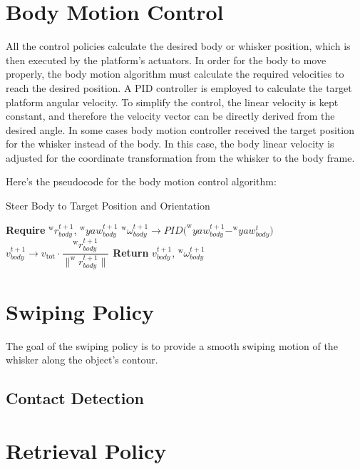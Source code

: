 \section{Body Motion Control}
All the control policies calculate the desired body or whisker position, which is then executed by the platform's actuators.
In order for the body to move properly, the body motion algorithm must calculate the required velocities to reach the desired position.
A PID controller is employed to calculate the target platform angular velocity.
To simplify the control, the linear velocity is kept constant, and therefore the velocity vector can be directly derived from the desired angle.
In some cases body motion controller received the target position for the whisker instead of the body.
In this case, the body linear velocity is adjusted for the coordinate transformation from the whisker to the body frame.

Here's the pseudocode for the body motion control algorithm:

\begin{algorithm}[htb]
    \caption{Steer Body to Target Position and Orientation}
    \begin{algorithmic}
        \State \textbf{Require} \(^{\mathrm{w}}r_{body}^{t+1}\), \(^{\mathrm{w}}yaw_{body}^{t+1}\)
        \State \(^{\mathrm{w}}\omega_{body}^{t+1} \rightarrow PID\Big(^{\mathrm{w}}yaw_{body}^{t+1} - ^{\mathrm{w}}yaw_{body}^{t}\Big)\)
        \State \(v_{body}^{t+1} \rightarrow v_{\textrm{tot}} \cdot \dfrac{^{\mathrm{w}}r_{body}^{t+1}}{\|^{\mathrm{w}}r_{body}^{t+1}\|}\)
        \State \textbf{Return} \(v_{body}^{t+1}\), \(^{\mathrm{w}}\omega_{body}^{t+1}\)
    \end{algorithmic}
    \label{alg:steer_body}
\end{algorithm}


\section{Swiping Policy}

The goal of the swiping policy is to provide a smooth swiping motion of the whisker along the object's contour.

\subsection{Contact Detection}


\section{Retrieval Policy}

